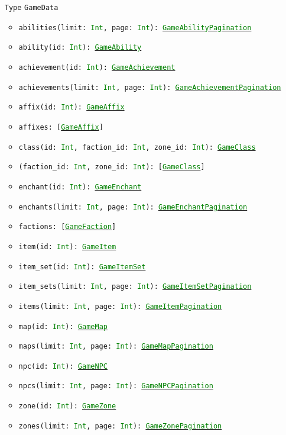 \documentclass[10pt, a4paper]{memoir}
\numberwithin{equation}{section}
\theoremstyle{plain}
\theoremstyle{defp}
\theoremstyle{dotless}
\theoremstyle{definition}
\theoremstyle{dotless}
\theoremstyle{dotless}
\theoremstyle{defp}
\theoremstyle{defp}
\theoremstyle{be}          %
\theoremstyle{defp}
\newcommand\ttt[1]{\texttt{#1}}
\newcommand\type[1]{\ttt{\textcolor{green}{#1}}}
\begin{document}
\begin{itemize}[noitemsep,topsep=1pt]
\item[\ttt{Type}] \ttt{GameData}
\begin{itemize}[itemsep=1pt,topsep=1pt]
\item \ttt{abilities(limit: \type{Int}, page: \type{Int}): \hyperref[sec:gameabilitypagination]{\type{GameAbilityPagination}}}
\item \ttt{ability(id: \type{Int}): \hyperref[sec:GameAbility]{\type{GameAbility}}}
\item \ttt{achievement(id: \type{Int}): \hyperref[sec:GameAchievement]{\type{GameAchievement}}}
\item \ttt{achievements(limit: \type{Int}, page: \type{Int}): \hyperref[sec:gameachievementpagination]{\type{GameAchievementPagination}}}
\item \ttt{affix(id: \type{Int}): \hyperref[sec:GameAffix]{\type{GameAffix}}}
\item \ttt{affixes: [\hyperref[sec:GameAffix]{\type{GameAffix}}]}
\item \ttt{class(id: \type{Int}, faction\_id: \type{Int}, zone\_id: \type{Int}): \hyperref[sec:GameClass]{\type{GameClass}}}
\item \ttt{(faction\_id: \type{Int}, zone\_id: \type{Int}): [\hyperref[sec:GameClass]{\type{GameClass}}]}
\item \ttt{enchant(id: \type{Int}): \hyperref[sec:GameEnchant]{\type{GameEnchant}}}
\item \ttt{enchants(limit: \type{Int}, page: \type{Int}): \hyperref[sec:gameenchantpagination]{\type{GameEnchantPagination}}}
\item \ttt{factions: [\hyperref[sec:GameFaction]{\type{GameFaction}}]}
\item \ttt{item(id: \type{Int}): \hyperref[sec:GameItem]{\type{GameItem}}}
\item \ttt{item\_set(id: \type{Int}): \hyperref[sec:GameItemSet]{\type{GameItemSet}}}
\item \ttt{item\_sets(limit: \type{Int}, page: \type{Int}): \hyperref[sec:gameitemsetpagination]{\type{GameItemSetPagination}}}
\item \ttt{items(limit: \type{Int}, page: \type{Int}): \hyperref[sec:gameitempagination]{\type{GameItemPagination}}}
\item \ttt{map(id: \type{Int}): \hyperref[sec:GameMap]{\type{GameMap}}}
\item \ttt{maps(limit: \type{Int}, page: \type{Int}): \hyperref[sec:gamemappagination]{\type{GameMapPagination}}}
\item \ttt{npc(id: \type{Int}): \hyperref[sec:GameNPC]{\type{GameNPC}}}
\item \ttt{npcs(limit: \type{Int}, page: \type{Int}): \hyperref[sec:gamenpcpagination]{\type{GameNPCPagination}}}
\item \ttt{zone(id: \type{Int}): \hyperref[sec:GameZone]{\type{GameZone}}}
\item \ttt{zones(limit: \type{Int}, page: \type{Int}): \hyperref[sec:gamezonepagination]{\type{GameZonePagination}}}
\end{itemize}
\end{itemize}
\end{document}
